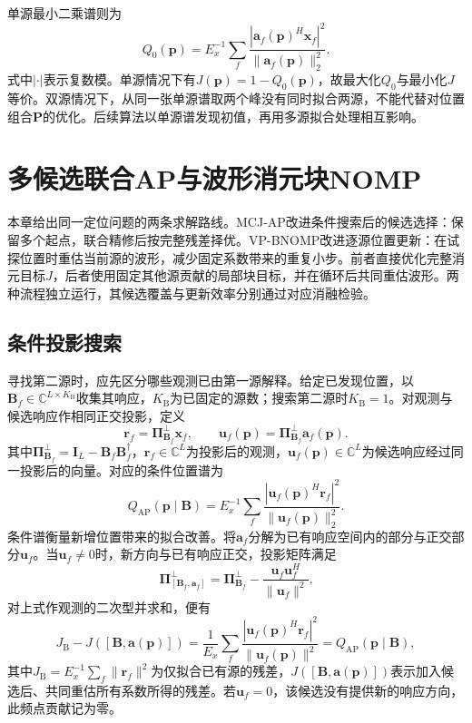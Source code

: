 \documentclass[a4paper,fleqn]{cas-sc}
\numberwithin{equation}{section}
\numberwithin{figure}{section}
\numberwithin{table}{section}
\newcommand{\C}{\mathbb C}
\begin{document}
单源最小二乘谱则为
\begin{equation}
 Q_0(\bm p)=E_x^{-1}\sum_f
 \frac{|\bm a_f(\bm p)^H\bm x_f|^2}{\|\bm a_f(\bm p)\|_2^2} .\label{eq:single}
\end{equation}
式中$|\cdot|$表示复数模。单源情况下有$J(\bm p)=1-Q_0(\bm p)$，故最大化$Q_0$与最小化$J$等价。双源情况下，从同一张单源谱取两个峰没有同时拟合两源，不能代替对位置组合$\bm P$的优化。后续算法以单源谱发现初值，再用多源拟合处理相互影响。



\section{多候选联合AP与波形消元块NOMP}\label{sec:methods}
本章给出同一定位问题的两条求解路线。MCJ-AP改进条件搜索后的候选选择：保留多个起点，联合精修后按完整残差择优。VP-BNOMP改进逐源位置更新：在试探位置时重估当前源的波形，减少固定系数带来的重复小步。前者直接优化完整消元目标$J$，后者使用固定其他源贡献的局部块目标，并在循环后共同重估波形。两种流程独立运行，其候选覆盖与更新效率分别通过对应消融检验。
\subsection{条件投影搜索}
寻找第二源时，应先区分哪些观测已由第一源解释。给定已发现位置，以$\bm B_f\in\C^{L\times K_{\mathrm B}}$收集其响应，$K_{\mathrm B}$为已固定的源数；搜索第二源时$K_{\mathrm B}=1$。对观测与候选响应作相同正交投影，定义
\begin{equation}
 \bm r_f=\bm\Pi_{\bm B_f}^{\perp}\bm x_f,\qquad
 \bm u_f(\bm p)=\bm\Pi_{\bm B_f}^{\perp}\bm a_f(\bm p).
\end{equation}
其中$\bm\Pi_{\bm B_f}^{\perp}=\bm I_L-\bm B_f\bm B_f^\dagger$，$\bm r_f\in\C^L$为投影后的观测，$\bm u_f(\bm p)\in\C^L$为候选响应经过同一投影后的向量。对应的条件位置谱为
\begin{equation}
 Q_{\mathrm{AP}}(\bm p\mid\bm B)
 =E_x^{-1}\sum_f\frac{|\bm u_f(\bm p)^H\bm r_f|^2}
 {\|\bm u_f(\bm p)\|_2^2}.\label{eq:conditional}
\end{equation}
条件谱衡量新增位置带来的拟合改善。将$\bm a_f$分解为已有响应空间内的部分与正交部分$\bm u_f$。当$\bm u_f\ne0$时，新方向与已有响应正交，投影矩阵满足
\begin{equation}
 \bm\Pi_{[\bm B_f,\bm a_f]}^{\perp}
 =\bm\Pi_{\bm B_f}^{\perp}
 -\frac{\bm u_f\bm u_f^H}{\|\bm u_f\|^2} .
\end{equation}
对上式作观测的二次型并求和，便有
\begin{equation}
 J_{\mathrm B}-J([\bm B,\bm a(\bm p)])
 =\frac1{E_x}\sum_f\frac{|\bm u_f(\bm p)^H\bm r_f|^2}
 {\|\bm u_f(\bm p)\|^2}
 =Q_{\mathrm{AP}}(\bm p\mid\bm B),\label{eq:conditionalGain}
\end{equation}
其中$J_{\mathrm B}=E_x^{-1}\sum_f\|\bm r_f\|^2$为仅拟合已有源的残差，$J([\bm B,\bm a(\bm p)])$表示加入候选后、共同重估所有系数所得的残差。若$\bm u_f=0$，该候选没有提供新的响应方向，此频点贡献记为零。
\end{document}
